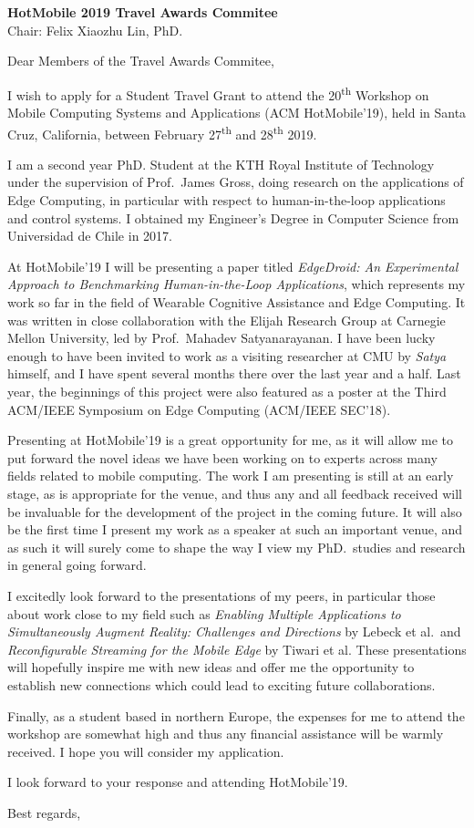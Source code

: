 \documentclass[english, 11pt]{kthletter}
\date{Stockholm, \today}
\begin{document}
\begin{letter}%
  {\textbf{HotMobile 2019 Travel Awards Commitee}\\Chair: Felix Xiaozhu Lin, PhD.}
\opening{Dear Members of the Travel Awards Commitee,}

I wish to apply for a Student Travel Grant to attend the 20\textsuperscript{th} Workshop on Mobile Computing Systems and Applications (ACM HotMobile'19), held in Santa Cruz, California, between February 27\textsuperscript{th} and 28\textsuperscript{th} 2019.

I am a second year PhD. Student at the KTH Royal Institute of Technology under the supervision of Prof.\ James Gross, doing research on the applications of Edge Computing, in particular with respect to human-in-the-loop applications and control systems.
I obtained my Engineer's Degree in Computer Science from Universidad de Chile in 2017.

At HotMobile'19 I will be presenting a paper titled \emph{EdgeDroid: An Experimental Approach to Benchmarking Human-in-the-Loop Applications}, which represents my work so far in the field of Wearable Cognitive Assistance and Edge Computing.
It was written in close collaboration with the Elijah Research Group at Carnegie Mellon University, led by Prof.\ Mahadev Satyanarayanan.
I have been lucky enough to have been invited to work as a visiting researcher at CMU by \emph{Satya} himself, and I have spent several months there over the last year and a half.
Last year, the beginnings of this project were also featured as a poster at the Third ACM/IEEE Symposium on Edge Computing (ACM/IEEE SEC'18).

Presenting at HotMobile'19 is a great opportunity for me, as it will allow me to put forward the novel ideas we have been working on to experts across many fields related to mobile computing.
The work I am presenting is still at an early stage, as is appropriate for the venue, and thus any and all feedback received will be invaluable for the development of the project in the coming future. It will also be the first time I present my work as a speaker at such an important venue, and as such it will surely come to shape the way I view my PhD.\ studies and research in general going forward.

I excitedly look forward to the presentations of my peers, in particular those about work close to my field such as \emph{Enabling Multiple Applications to Simultaneously Augment Reality: Challenges and Directions} by Lebeck et al.\ and \emph{Reconfigurable Streaming for the Mobile Edge} by Tiwari et al.
These presentations will hopefully inspire me with new ideas and offer me the opportunity to establish new connections which could lead to exciting future collaborations.

Finally, as a student based in northern Europe, the expenses for me to attend the workshop are somewhat high and thus any financial assistance will be warmly received.
I hope you will consider my application.

I look forward to your response and attending HotMobile'19.

\closing{Best regards,}

\end{letter}
\end{document}
